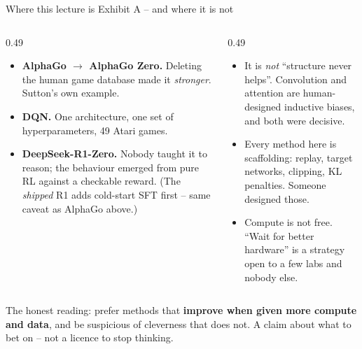 \documentclass[aspectratio=169]{beamer}
\begin{document}
\begin{frame}{Where this lecture is Exhibit A -- and where it is not}
  \begin{columns}[T]
    \begin{column}{0.49\textwidth}
      \begin{tcolorbox}[colback=paramgreen!8, colframe=paramgreen, boxrule=0.6pt, arc=2pt,
                        title=\textbf{Evidence for}]
        \scriptsize
        \begin{itemize}\itemsep2pt
          \item \textbf{AlphaGo $\to$ AlphaGo Zero.} Deleting the human game database made it
                \emph{stronger}. Sutton's own example.
          \item \textbf{DQN.} One architecture, one set of hyperparameters, 49 Atari games.
          \item \textbf{DeepSeek-R1-Zero.} Nobody taught it to reason; the behaviour emerged
                from pure RL against a checkable reward. (The \emph{shipped} R1 adds cold-start
                SFT first -- same caveat as AlphaGo above.)
        \end{itemize}
      \end{tcolorbox}
    \end{column}
    \begin{column}{0.49\textwidth}
      \begin{tcolorbox}[colback=armorange!12, colframe=armorange, boxrule=0.6pt, arc=2pt,
                        title=\textbf{Read it carefully, though}]
        \scriptsize
        \begin{itemize}\itemsep2pt
          \item It is \emph{not} ``structure never helps''. Convolution and attention are
                human-designed inductive biases, and both were decisive.
          \item Every method here is scaffolding: replay, target networks, clipping, KL
                penalties. Someone designed those.
          \item Compute is not free. ``Wait for better hardware'' is a strategy open to a few
                labs and nobody else.
        \end{itemize}
      \end{tcolorbox}
    \end{column}
  \end{columns}

  \vskip 5pt
  \begin{tcolorbox}[colback=lightbg, colframe=popblue, boxrule=0.6pt, arc=2pt]
    \scriptsize
    The honest reading: prefer methods that \textbf{improve when given more compute and data},
    and be suspicious of cleverness that does not. A claim about what to bet on -- not a licence
    to stop thinking.
  \end{tcolorbox}
\end{frame}
\end{document}
